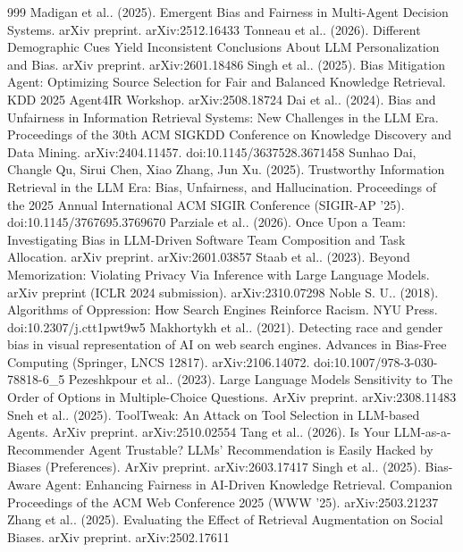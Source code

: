\documentclass[10pt]{article}
\begin{document}
\begin{thebibliography}{999}
 Madigan et al.. (2025). Emergent Bias and Fairness in Multi-Agent Decision Systems. arXiv preprint. arXiv:2512.16433
 Tonneau et al.. (2026). Different Demographic Cues Yield Inconsistent Conclusions About LLM Personalization and Bias. arXiv preprint. arXiv:2601.18486
 Singh et al.. (2025). Bias Mitigation Agent: Optimizing Source Selection for Fair and Balanced Knowledge Retrieval. KDD 2025 Agent4IR Workshop. arXiv:2508.18724
 Dai et al.. (2024). Bias and Unfairness in Information Retrieval Systems: New Challenges in the LLM Era. Proceedings of the 30th ACM SIGKDD Conference on Knowledge Discovery and Data Mining. arXiv:2404.11457. doi:10.1145/3637528.3671458
 Sunhao Dai, Changle Qu, Sirui Chen, Xiao Zhang, Jun Xu. (2025). Trustworthy Information Retrieval in the LLM Era: Bias, Unfairness, and Hallucination. Proceedings of the 2025 Annual International ACM SIGIR Conference (SIGIR-AP '25). doi:10.1145/3767695.3769670
 Parziale et al.. (2026). Once Upon a Team: Investigating Bias in LLM-Driven Software Team Composition and Task Allocation. arXiv preprint. arXiv:2601.03857
 Staab et al.. (2023). Beyond Memorization: Violating Privacy Via Inference with Large Language Models. arXiv preprint (ICLR 2024 submission). arXiv:2310.07298
 Noble S. U.. (2018). Algorithms of Oppression: How Search Engines Reinforce Racism. NYU Press. doi:10.2307/j.ctt1pwt9w5
 Makhortykh et al.. (2021). Detecting race and gender bias in visual representation of AI on web search engines. Advances in Bias-Free Computing (Springer, LNCS 12817). arXiv:2106.14072. doi:10.1007/978-3-030-78818-6\_5
 Pezeshkpour et al.. (2023). Large Language Models Sensitivity to The Order of Options in Multiple-Choice Questions. ArXiv preprint. arXiv:2308.11483
 Sneh et al.. (2025). ToolTweak: An Attack on Tool Selection in LLM-based Agents. ArXiv preprint. arXiv:2510.02554
 Tang et al.. (2026). Is Your LLM-as-a-Recommender Agent Trustable? LLMs' Recommendation is Easily Hacked by Biases (Preferences). ArXiv preprint. arXiv:2603.17417
 Singh et al.. (2025). Bias-Aware Agent: Enhancing Fairness in AI-Driven Knowledge Retrieval. Companion Proceedings of the ACM Web Conference 2025 (WWW '25). arXiv:2503.21237
 Zhang et al.. (2025). Evaluating the Effect of Retrieval Augmentation on Social Biases. arXiv preprint. arXiv:2502.17611

\end{thebibliography}
\end{document}
